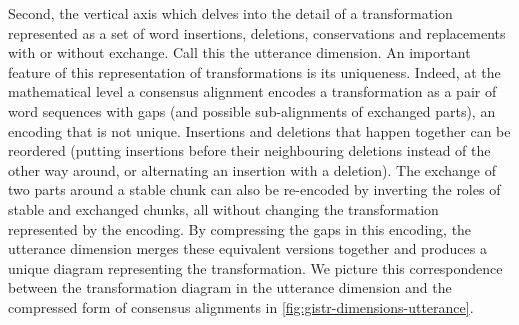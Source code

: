 Second, the vertical axis which delves into the detail of a
transformation represented as a set of word insertions, deletions,
conservations and replacements with or without exchange. Call this the
utterance dimension. An important feature of this representation of
transformations is its uniqueness. Indeed, at the mathematical level a
consensus alignment encodes a transformation as a pair of word sequences
with gaps (and possible sub-alignments of exchanged parts), an encoding
that is not unique. Insertions and deletions that happen together can be
reordered (putting insertions before their neighbouring deletions
instead of the other way around, or alternating an insertion with a
deletion). The exchange of two parts around a stable chunk can also be
re-encoded by inverting the roles of stable and exchanged chunks, all
without changing the transformation represented by the encoding. By
compressing the gaps in this encoding, the utterance dimension merges
these equivalent versions together and produces a unique diagram
representing the transformation. We picture this correspondence between
the transformation diagram in the utterance dimension and the compressed
form of consensus alignments in \cref{fig:gistr-dimensions-utterance}.

